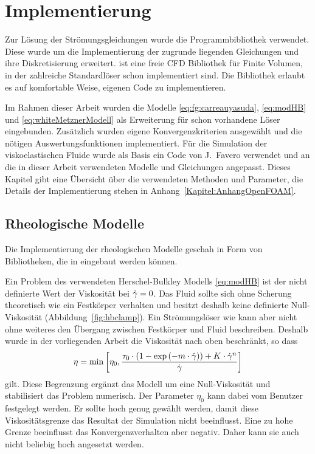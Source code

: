\section{Implementierung}
\label{Kapitel:Implementierung}
Zur Lösung der Strömungsgleichungen wurde die Programmbibliothek \linebreak \openfoam{} \cite{openfoam} verwendet.
Diese wurde um die Implementierung der zugrunde liegenden Gleichungen und ihre Diskretisierung erweitert.
\openfoam{} ist eine freie CFD Bibliothek für Finite Volumen, in der zahlreiche Standardlöser schon implementiert sind.
Die Bibliothek erlaubt es auf komfortable Weise, eigenen Code zu implementieren.

Im Rahmen dieser Arbeit wurden die Modelle \eqref{eq:fg:carreauyasuda}, \eqref{eq:modHB} und \eqref{eq:whiteMetznerModell} als Erweiterung für schon vorhandene Löser eingebunden. Zusätzlich wurden eigene Konvergenzkriterien ausgewählt und die nötigen Auswertungsfunktionen implementiert.
Für die Simulation der viskoelastischen Fluide wurde als Basis ein Code von J.~Favero \cite{faveroOF} verwendet und an die in dieser Arbeit verwendeten Modelle und Gleichungen angepasst.
Dieses Kapitel gibt eine Übersicht über die verwendeten Methoden und Parameter, die Details der Implementierung stehen in Anhang~\ref{Kapitel:AnhangOpenFOAM}.

\subsection{Rheologische Modelle}
Die Implementierung der rheologischen Modelle geschah in Form von Bi\-blio\-the\-ken, die in \openfoam{} eingebaut werden können.

Ein Problem des verwendeten Herschel-Bulkley Modells \eqref{eq:modHB} ist der nicht definierte Wert der Viskosität bei $\dot\gamma=0$.
Das Fluid sollte sich ohne Scherung theoretisch wie ein Festkörper verhalten und besitzt deshalb keine definierte Null-Viskosität (Abbildung~\ref{fig:hbclamp}).
Ein Strömungslöser wie \openfoam{} kann aber nicht ohne weiteres den Übergang zwischen Festkörper und Fluid beschreiben. Deshalb wurde in der vorliegenden Arbeit die Viskosität nach oben beschränkt, so dass
%
\begin{equation}
    \eta = \min \left[ \eta_0, \frac{\tau_0\cdot\left(1-\exp\left( -m\cdot\dot\gamma \right)\right)+K\cdot \dot\gamma^n}{\dot\gamma} \right]
\end{equation}
%
gilt.
Diese Begrenzung ergänzt das Modell um eine Null-Viskosität und stabilisiert das Problem numerisch. Der Parameter $\eta_0$ kann dabei vom Benutzer festgelegt werden. Er sollte hoch genug gewählt werden, damit diese Viskositätsgrenze das Resultat der Simulation nicht beeinflusst. Eine zu hohe Grenze beeinflusst das Konvergenzverhalten aber negativ. Daher kann sie auch nicht beliebig hoch angesetzt werden.

